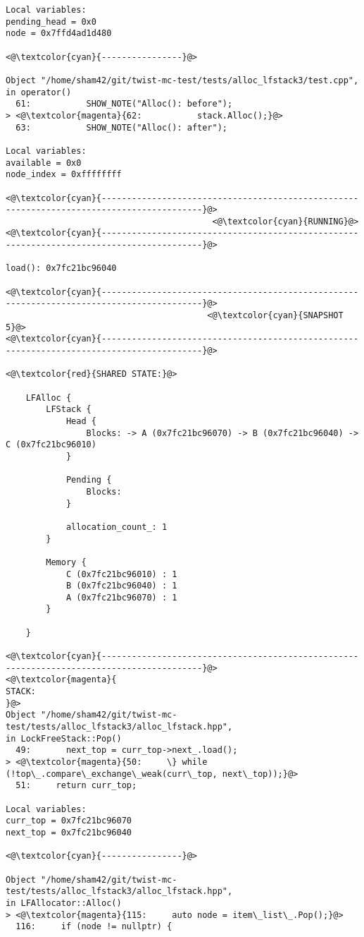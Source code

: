 \begin{adjustwidth}{-3.3cm}{-1cm}
\begin{allintypewriter}
\begin{multicols*}{2}
\begin{lstlisting}[numbers=none]
Local variables: 
pending_head = 0x0
node = 0x7ffd4ad1d480

<@\textcolor{cyan}{----------------}@>

Object "/home/sham42/git/twist-mc-test/tests/alloc_lfstack3/test.cpp",
in operator()
  61:           SHOW_NOTE("Alloc(): before");
> <@\textcolor{magenta}{62:           stack.Alloc();}@>
  63:           SHOW_NOTE("Alloc(): after");

Local variables: 
available = 0x0
node_index = 0xffffffff

<@\textcolor{cyan}{------------------------------------------------------------------------------------------}@>
                                         <@\textcolor{cyan}{RUNNING}@>
<@\textcolor{cyan}{------------------------------------------------------------------------------------------}@>

load(): 0x7fc21bc96040

<@\textcolor{cyan}{------------------------------------------------------------------------------------------}@>
                                        <@\textcolor{cyan}{SNAPSHOT 5}@>
<@\textcolor{cyan}{------------------------------------------------------------------------------------------}@>

<@\textcolor{red}{SHARED STATE:}@>

    LFAlloc {
	    LFStack {
		    Head {
			    Blocks: -> A (0x7fc21bc96070) -> B (0x7fc21bc96040) -> C (0x7fc21bc96010) 
		    }

		    Pending {
			    Blocks: 
		    }

		    allocation_count_: 1
	    }

	    Memory {
		    C (0x7fc21bc96010) : 1
		    B (0x7fc21bc96040) : 1
		    A (0x7fc21bc96070) : 1
	    }

    }

<@\textcolor{cyan}{------------------------------------------------------------------------------------------}@>
<@\textcolor{magenta}{
STACK:
}@>
Object "/home/sham42/git/twist-mc-test/tests/alloc_lfstack3/alloc_lfstack.hpp",
in LockFreeStack::Pop()
  49:       next_top = curr_top->next_.load();
> <@\textcolor{magenta}{50:     \} while (!top\_.compare\_exchange\_weak(curr\_top, next\_top));}@>
  51:     return curr_top;

Local variables: 
curr_top = 0x7fc21bc96070
next_top = 0x7fc21bc96040

<@\textcolor{cyan}{----------------}@>

Object "/home/sham42/git/twist-mc-test/tests/alloc_lfstack3/alloc_lfstack.hpp",
in LFAllocator::Alloc()
> <@\textcolor{magenta}{115:     auto node = item\_list\_.Pop();}@>
  116:     if (node != nullptr) {


\end{lstlisting}
\end{multicols*}
\end{allintypewriter}
\end{adjustwidth}
